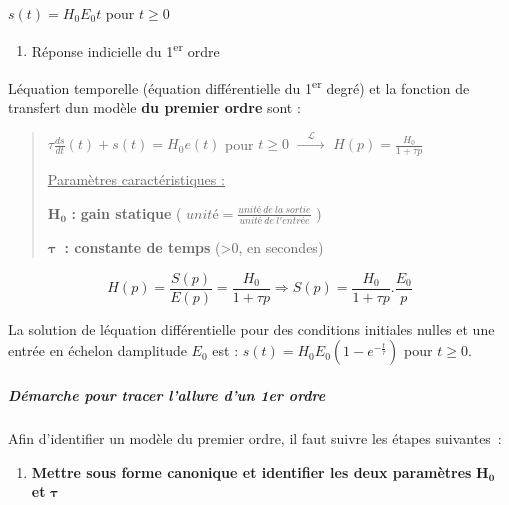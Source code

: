 \(s(t) = H_{0}E_{0}t\) pour \(t \geq 0\)

\begin{enumerate}
\def\labelenumi{\arabic{enumi}.}
\setcounter{enumi}{2}
\item
  \protect\hypertarget{_Toc379198200}{}{}Réponse indicielle du 1\textsuperscript{er} ordre
\end{enumerate}

L\textquotesingle équation temporelle (équation différentielle du 1\textsuperscript{er} degré) et la fonction de transfert d\textquotesingle un modèle \textbf{du premier ordre} sont :

\begin{quote}
\(\tau\frac{ds}{dt}(t) + s(t) = H_{0}e(t)\) pour \(t \geq 0\) \(\overset{\quad\mathcal{L}\quad}{\rightarrow}\) \(H(p) = \frac{H_{0}}{1 + \tau p}\)

\ul{Paramètres caractéristiques :}

\(\mathbf{H}_{\mathbf{0}}\) \textbf{:} \textbf{gain statique} ( \(unité = \frac{unité\ de\ la\ sortie}{unité\ de\ l'entrée}\) )

\(\mathbf{\tau}\)\textbf{~: constante de temps} (\textgreater0, en secondes)
\end{quote}

\[H(p) = \frac{S(p)}{E(p)} = \frac{H_{0}}{1 + \tau p} \Rightarrow S(p) = \frac{H_{0}}{1 + \tau p}.\frac{E_{0}}{p}\]

La solution de l\textquotesingle équation différentielle pour des conditions initiales nulles et une entrée en échelon d\textquotesingle amplitude \(E_{0}\) est : \(s(t) = H_{0}E_{0}\left( 1 - e^{- \frac{t}{\tau}} \right)\) pour \(t \geq 0\).

\hypertarget{duxe9marche-pour-tracer-lallure-dun-1er-ordre}{%
\subparagraph*{\texorpdfstring{Démarche pour tracer l'allure d'un 1er ordre }{Démarche pour tracer l'allure d'un 1er ordre }}\label{duxe9marche-pour-tracer-lallure-dun-1er-ordre}}

Afin d'identifier un modèle du premier ordre, il faut suivre les étapes suivantes~:

\begin{enumerate}
\def\labelenumi{\arabic{enumi}.}
\item
  \textbf{Mettre sous forme canonique et identifier les deux paramètres} \(\mathbf{H}_{\mathbf{0}}\) \textbf{et} \(\mathbf{\tau}\)
\end{enumerate}

